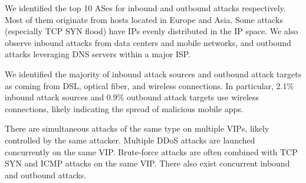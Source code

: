 \begin{encompact}





\item We identified the top 10 ASes for inbound and outbound attacks respectively. Most of them 
originate from hosts located in Europe and Asia. Some attacks (especially TCP SYN flood) have IPs evenly distributed in the IP space. 
We also observe inbound attacks from data centers and mobile networks, and outbound attacks leveraging DNS servers within a major ISP.


\item  We identified the majority of inbound attack sources and outbound attack targets as coming from DSL, optical fiber, and wireless connections. In particular, 2.1\% inbound attack sources and 0.9\% outbound attack targets use wireless connections, likely indicating the spread of malicious mobile apps. 


\item There are simultaneous attacks of the same type on multiple VIPs, likely controlled by the same attacker. 
Multiple DDoS attacks are launched concurrently on the same VIP. Brute-force attacks are often combined with TCP SYN and ICMP attacks on the same VIP. There also exist concurrent inbound and outbound attacks.
\end{encompact}



